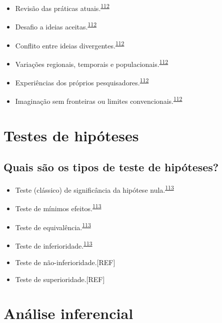 \documentclass[
]{book}
\begin{document}
\begin{itemize}
\item
  Revisão das práticas atuais.\textsuperscript{\protect\hyperlink{ref-Vandenbroucke2018}{112}}
\item
  Desafio a ideias aceitas.\textsuperscript{\protect\hyperlink{ref-Vandenbroucke2018}{112}}
\item
  Conflito entre ideias divergentes.\textsuperscript{\protect\hyperlink{ref-Vandenbroucke2018}{112}}
\item
  Variações regionais, temporais e populacionais.\textsuperscript{\protect\hyperlink{ref-Vandenbroucke2018}{112}}
\item
  Experiências dos próprios pesquisadores.\textsuperscript{\protect\hyperlink{ref-Vandenbroucke2018}{112}}
\item
  Imaginação sem fronteiras ou limites convencionais.\textsuperscript{\protect\hyperlink{ref-Vandenbroucke2018}{112}}
\end{itemize}

\hypertarget{erros-inferencia}{%
\section{Testes de hipóteses}\label{erros-inferencia}}

\hypertarget{quais-suxe3o-os-tipos-de-teste-de-hipuxf3teses}{%
\subsection{Quais são os tipos de teste de hipóteses?}\label{quais-suxe3o-os-tipos-de-teste-de-hipuxf3teses}}

\begin{itemize}
\item
  Teste (clássico) de significância da hipótese nula.\textsuperscript{\protect\hyperlink{ref-lakens2018}{113}}
\item
  Teste de mínimos efeitos.\textsuperscript{\protect\hyperlink{ref-lakens2018}{113}}
\item
  Teste de equivalência.\textsuperscript{\protect\hyperlink{ref-lakens2018}{113}}
\item
  Teste de inferioridade.\textsuperscript{\protect\hyperlink{ref-lakens2018}{113}}
\item
  Teste de não-inferioridade.{[}REF{]}
\item
  Teste de superioridade.{[}REF{]}
\end{itemize}

\hypertarget{inferencial}{%
\section{Análise inferencial}\label{inferencial}}
\end{document}
